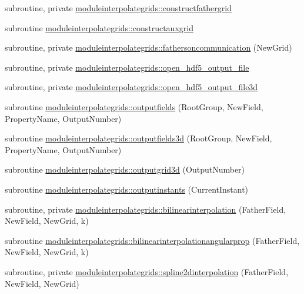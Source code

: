 \begin{DoxyCompactItemize}
\item 
subroutine, private \mbox{\hyperlink{namespacemoduleinterpolategrids_a1563ccf4009718586332881b09394382}{moduleinterpolategrids\+::constructfathergrid}}
\item 
subroutine \mbox{\hyperlink{namespacemoduleinterpolategrids_ae09eebd1096118a9d8f6af67ad2eeb67}{moduleinterpolategrids\+::constructauxgrid}}
\item 
subroutine, private \mbox{\hyperlink{namespacemoduleinterpolategrids_a20e11038e33700a28ecb799dc0420e26}{moduleinterpolategrids\+::fathersoncommunication}} (New\+Grid)
\item 
subroutine, private \mbox{\hyperlink{namespacemoduleinterpolategrids_adb5ceaa8539e3f7a80b1968dfc2bb3f7}{moduleinterpolategrids\+::open\+\_\+hdf5\+\_\+output\+\_\+file}}
\item 
subroutine, private \mbox{\hyperlink{namespacemoduleinterpolategrids_a6d188a490cb72184e7a2cec4c423af97}{moduleinterpolategrids\+::open\+\_\+hdf5\+\_\+output\+\_\+file3d}}
\item 
subroutine \mbox{\hyperlink{namespacemoduleinterpolategrids_ad87c7dfcb85e39e6f0f2e95dd4f65391}{moduleinterpolategrids\+::outputfields}} (Root\+Group, New\+Field, Property\+Name, Output\+Number)
\item 
subroutine \mbox{\hyperlink{namespacemoduleinterpolategrids_aa57bfeb2d55f2dec2c8b2e7b627fd6bf}{moduleinterpolategrids\+::outputfields3d}} (Root\+Group, New\+Field, Property\+Name, Output\+Number)
\item 
subroutine \mbox{\hyperlink{namespacemoduleinterpolategrids_a95af09d76985241fb13663924158fb28}{moduleinterpolategrids\+::outputgrid3d}} (Output\+Number)
\item 
subroutine \mbox{\hyperlink{namespacemoduleinterpolategrids_a43f25c3ca1c96f174547603ebbf37ad0}{moduleinterpolategrids\+::outputinstants}} (Current\+Instant)
\item 
subroutine, private \mbox{\hyperlink{namespacemoduleinterpolategrids_aa9562e1a85edb00f05d06ebe2ec3f113}{moduleinterpolategrids\+::bilinearinterpolation}} (Father\+Field, New\+Field, New\+Grid, k)
\item 
subroutine \mbox{\hyperlink{namespacemoduleinterpolategrids_ad1fbdcc1429662d0522479b1e7933859}{moduleinterpolategrids\+::bilinearinterpolationangularprop}} (Father\+Field, New\+Field, New\+Grid, k)
\item 
subroutine, private \mbox{\hyperlink{namespacemoduleinterpolategrids_a5189e275a7867c5dd3f1a55dca3dacf3}{moduleinterpolategrids\+::spline2dinterpolation}} (Father\+Field, New\+Field, New\+Grid)

\end{DoxyCompactItemize}
